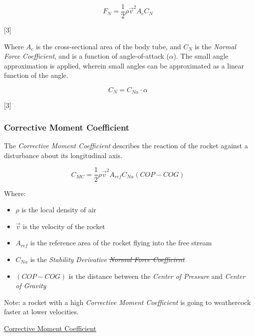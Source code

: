 \documentclass[]{article}
\providecommand{\tightlist}{%
  \setlength{\itemsep}{0pt}\setlength{\parskip}{0pt}}
\begin{document}
\begin{equation}
\label{rocket_normal_force}
F_{N} = \dfrac{1}{2} \rho \vec{v}^2 A_{c} C_N
\end{equation}

{[}3{]}

Where \(A_c\) is the cross-sectional area of the body tube, and \(C_N\)
is the \emph{Normal Force Coefficient}, and is a function of
angle-of-attack (\(\alpha\)). The small angle approximation is applied,
wherein small angles can be approximated as a linear function of the
angle.

\begin{equation}
\label{normal_force_coefficient}
C_N = C_{N \alpha} \cdot \alpha
\end{equation}

{[}3{]}

\subsubsection{Corrective Moment
Coefficient}\label{corrective-moment-coefficient}

The \emph{Corrective Moment Coefficient} describes the reaction of the
rocket against a disturbance about its longitudinal axis.

\begin{equation}
\label{eq_coef_moment_corrective}
C_{MC} = \dfrac{1}{2} \rho \vec{v}^2 A_{ref} C_{N \alpha} (COP-COG)
\end{equation}

Where:

\begin{itemize}
\tightlist
\item
  \(\rho\) is the local density of air
\item
  \(\vec{v}\) is the velocity of the rocket
\item
  \(A_{ref}\) is the reference area of the rocket flying into the free
  stream
\item
  \(C_{N \alpha}\) is the \emph{Stability Derivative} \sout{\emph{Normal
  Force Coefficient}}
\item
  \((COP-COG)\) is the distance between the \emph{Center of Pressure}
  and \emph{Center of Gravity}
\end{itemize}

Note: a rocket with a high \emph{Corrective Moment Coefficient} is going
to weathercock faster at lower velocities.

\href{https://www.apogeerockets.com/education/downloads/Newsletter193.pdf}{Corrective
Moment Coefficient}
\end{document}
